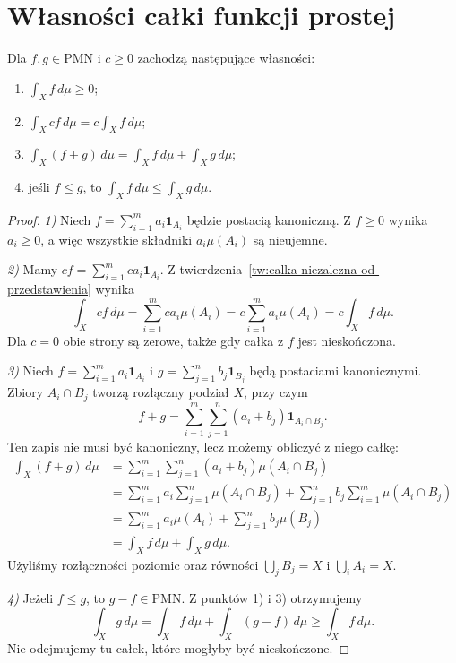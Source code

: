 \section{Własności całki funkcji prostej}
\label{sec:wlasnosci-calki-prostej}

\begin{twierdzenie}
\label{tw:wlasnosci-calki-prostej}
Dla $f,g\in\mathrm{PMN}$ i $c\geq0$ zachodzą następujące własności:
\begin{enumerate}
  \item $\displaystyle\int_X f\,d\mu\geq0$;
  \item $\displaystyle\int_X cf\,d\mu=c\int_X f\,d\mu$;
  \item $\displaystyle\int_X(f+g)\,d\mu
          =\int_X f\,d\mu+\int_X g\,d\mu$;
  \item jeśli $f\leq g$, to
        $\displaystyle\int_X f\,d\mu\leq\int_X g\,d\mu$.
\end{enumerate}
\end{twierdzenie}

\begin{proof}
\emph{1)} Niech $f=\sum_{i=1}^{m}a_i\mathbf{1}_{A_i}$ będzie postacią
kanoniczną. Z $f\geq0$ wynika $a_i\geq0$, a więc wszystkie składniki
$a_i\mu(A_i)$ są nieujemne.

\emph{2)} Mamy $cf=\sum_{i=1}^{m}ca_i\mathbf{1}_{A_i}$.
Z twierdzenia~\ref{tw:calka-niezalezna-od-przedstawienia} wynika
\[
  \int_X cf\,d\mu
  =\sum_{i=1}^{m}ca_i\mu(A_i)
  =c\sum_{i=1}^{m}a_i\mu(A_i)
  =c\int_X f\,d\mu.
\]
Dla $c=0$ obie strony są zerowe, także gdy całka z $f$ jest nieskończona.

\emph{3)} Niech $f=\sum_{i=1}^{m}a_i\mathbf{1}_{A_i}$ i
$g=\sum_{j=1}^{n}b_j\mathbf{1}_{B_j}$ będą postaciami kanonicznymi.
Zbiory $A_i\cap B_j$ tworzą rozłączny podział $X$, przy czym
\[
  f+g=\sum_{i=1}^{m}\sum_{j=1}^{n}
       (a_i+b_j)\mathbf{1}_{A_i\cap B_j}.
\]
Ten zapis nie musi być kanoniczny, lecz możemy obliczyć z niego całkę:
\begin{align*}
  \int_X(f+g)\,d\mu
  &=\sum_{i=1}^{m}\sum_{j=1}^{n}(a_i+b_j)\mu(A_i\cap B_j)\\
  &=\sum_{i=1}^{m}a_i\sum_{j=1}^{n}\mu(A_i\cap B_j)
    +\sum_{j=1}^{n}b_j\sum_{i=1}^{m}\mu(A_i\cap B_j)\\
  &=\sum_{i=1}^{m}a_i\mu(A_i)+\sum_{j=1}^{n}b_j\mu(B_j)\\
  &=\int_X f\,d\mu+\int_X g\,d\mu.
\end{align*}
Użyliśmy rozłączności poziomic oraz równości
$\bigcup_j B_j=X$ i $\bigcup_i A_i=X$.

\emph{4)} Jeżeli $f\leq g$, to $g-f\in\mathrm{PMN}$. Z punktów 1) i 3)
otrzymujemy
\[
  \int_X g\,d\mu
  =\int_X f\,d\mu+\int_X(g-f)\,d\mu
  \geq\int_X f\,d\mu.
\]
Nie odejmujemy tu całek, które mogłyby być nieskończone.
\end{proof}

